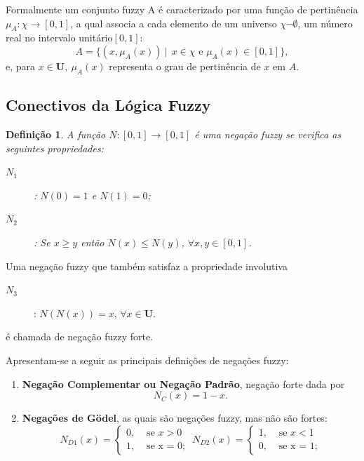 \documentclass[tcc,capa]{texufpel}
\newtheorem{Def}{Defini\c c\~ao}
\begin{document}
Formalmente um conjunto fuzzy A é caracterizado por uma função de pertinência $\mu_A : \chi \rightarrow [0,1]$, a qual associa a cada elemento de um universo $\chi \neg \emptyset$, um número real no intervalo unitário$[0,1]$:
\begin{equation}
    A = \{ (x,\mu_{A}(x))  ~|~  ~x\in \chi \mbox{   e   } \mu_{A}(x) \in [0,1] \}, 
\end{equation}
e, para $x\in \mathbf{U}, ~\mu_A(x)$ representa o grau de pertinência de $x$ em $A$. 
  
\subsection{Conectivos da Lógica Fuzzy}

\begin{Def}
A função $N:[0,1] \rightarrow [0,1]$ é uma \emph{negação fuzzy} se verifica as seguintes propriedades:
\begin{description}
\item [$N_1$]: $N(0) = 1$ e  $N(1) = 0$;

\item [$N_2$]: Se $x \geq y$ então $N(x)\leq N(y)$, $\forall x,y \in [0,1]$.
\end{description} 
\end{Def}
Uma negação fuzzy que também satisfaz a propriedade involutiva 
\begin{description}
\item [$N_3$]: $N(N(x))=x$, $\forall x \in \mathbf{U}$.
\end{description}
é chamada de negação fuzzy forte.
 
\newpage

Apresentam-se a seguir as principais definições de negações fuzzy:
\begin{enumerate}
\item \textbf{Negação Complementar ou Negação Padrão}, negação forte dada por~~
\begin{equation}\label{ex-st-neg}N_C(x)=1-x.\end{equation}


\item \textbf{Negações de Gödel}, as quais são negações fuzzy, mas não são fortes:
\begin{equation}
N_{D1}(x)=
\left \{
\begin{array}{ll}
0,            & \mbox{ se $x > 0$} \\
1 , & \mbox{ se x = 0;}
\end{array}
\right. \,\, 
N_{D2}(x)=
\left \{
\begin{array}{ll}
1,            & \mbox{ se $x < 1$} \\
0 , & \mbox{ se x = 1;}
\end{array}
\right.
\end{equation}
\end{enumerate}
\end{document}
